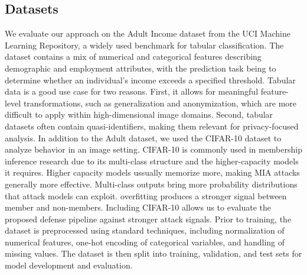 \documentclass[conference]{IEEEtran}
\begin{document}
\subsection{Datasets}
We evaluate our approach on the Adult Income dataset from the UCI Machine Learning Repository, a widely used benchmark for tabular classification. The dataset contains a mix of numerical and categorical features describing demographic and employment attributes, with the prediction task being to determine whether an individual’s income exceeds a specified threshold. 
Tabular data is a good use case for two reasons. First, it allows for meaningful feature-level transformations, such as generalization and anonymization, which are more difficult to apply within high-dimensional image domains. Second, tabular datasets often contain quasi-identifiers, making them relevant for privacy-focused analysis.
In addition to the Adult dataset, we used the CIFAR-10 dataset to analyze behavior in an image setting. CIFAR-10 is commonly used in membership inference research due to its multi-class structure and the higher-capacity models it requires. 
Higher capacity models ussually memorize more, making MIA attacks generally more effective. Multi-class outputs bring more probability distributions that attack models can exploit. overfitting produces a stronger signal between member and non-members. Including CIFAR-10 allows us to evaluate the proposed defense pipeline against stronger attack signals.
Prior to training, the dataset is preprocessed using standard techniques, including normalization of numerical features, one-hot encoding of categorical variables, and handling of missing values. The dataset is then split into training, validation, and test sets for model development and evaluation.
\end{document}
